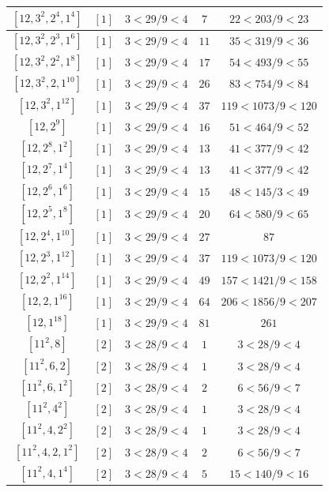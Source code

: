 \documentclass{article}%
\begin{document}
\begin{center}
\begin{longtable}{||c|c|c|c|c||}
$[12, 3^{2}, 2^{4}, 1^{4}]$ & $[1]$ & $3 < 29/9 < 4$ & $7$ & $22 < 203/9 < 23$ \\ \hline 
$[12, 3^{2}, 2^{3}, 1^{6}]$ & $[1]$ & $3 < 29/9 < 4$ & $11$ & $35 < 319/9 < 36$ \\ \hline 
$[12, 3^{2}, 2^{2}, 1^{8}]$ & $[1]$ & $3 < 29/9 < 4$ & $17$ & $54 < 493/9 < 55$ \\ \hline 
$[12, 3^{2}, 2, 1^{10}]$ & $[1]$ & $3 < 29/9 < 4$ & $26$ & $83 < 754/9 < 84$ \\ \hline 
$[12, 3^{2}, 1^{12}]$ & $[1]$ & $3 < 29/9 < 4$ & $37$ & $119 < 1073/9 < 120$ \\ \hline 
$[12, 2^{9}]$ & $[1]$ & $3 < 29/9 < 4$ & $16$ & $51 < 464/9 < 52$ \\ \hline 
$[12, 2^{8}, 1^{2}]$ & $[1]$ & $3 < 29/9 < 4$ & $13$ & $41 < 377/9 < 42$ \\ \hline 
$[12, 2^{7}, 1^{4}]$ & $[1]$ & $3 < 29/9 < 4$ & $13$ & $41 < 377/9 < 42$ \\ \hline 
$[12, 2^{6}, 1^{6}]$ & $[1]$ & $3 < 29/9 < 4$ & $15$ & $48 < 145/3 < 49$ \\ \hline 
$[12, 2^{5}, 1^{8}]$ & $[1]$ & $3 < 29/9 < 4$ & $20$ & $64 < 580/9 < 65$ \\ \hline 
$[12, 2^{4}, 1^{10}]$ & $[1]$ & $3 < 29/9 < 4$ & $27$ & $87$ \\ \hline 
$[12, 2^{3}, 1^{12}]$ & $[1]$ & $3 < 29/9 < 4$ & $37$ & $119 < 1073/9 < 120$ \\ \hline 
$[12, 2^{2}, 1^{14}]$ & $[1]$ & $3 < 29/9 < 4$ & $49$ & $157 < 1421/9 < 158$ \\ \hline 
$[12, 2, 1^{16}]$ & $[1]$ & $3 < 29/9 < 4$ & $64$ & $206 < 1856/9 < 207$ \\ \hline 
$[12, 1^{18}]$ & $[1]$ & $3 < 29/9 < 4$ & $81$ & $261$ \\ \hline 
$[11^{2}, 8]$ & $[2]$ & $3 < 28/9 < 4$ & $1$ & $3 < 28/9 < 4$ \\ \hline 
$[11^{2}, 6, 2]$ & $[2]$ & $3 < 28/9 < 4$ & $1$ & $3 < 28/9 < 4$ \\ \hline 
$[11^{2}, 6, 1^{2}]$ & $[2]$ & $3 < 28/9 < 4$ & $2$ & $6 < 56/9 < 7$ \\ \hline 
$[11^{2}, 4^{2}]$ & $[2]$ & $3 < 28/9 < 4$ & $1$ & $3 < 28/9 < 4$ \\ \hline 
$[11^{2}, 4, 2^{2}]$ & $[2]$ & $3 < 28/9 < 4$ & $1$ & $3 < 28/9 < 4$ \\ \hline 
$[11^{2}, 4, 2, 1^{2}]$ & $[2]$ & $3 < 28/9 < 4$ & $2$ & $6 < 56/9 < 7$ \\ \hline 
$[11^{2}, 4, 1^{4}]$ & $[2]$ & $3 < 28/9 < 4$ & $5$ & $15 < 140/9 < 16$ \\ \hline 

\end{longtable}
\end{center}
\end{document}
